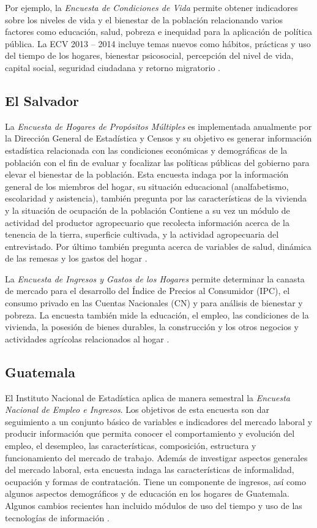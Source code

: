 \documentclass[
  12pt,
]{book}
\begin{document}
Por ejemplo, la \emph{Encuesta de Condiciones de Vida} permite obtener indicadores sobre los niveles de vida y el bienestar de la población relacionando varios factores como educación, salud, pobreza e inequidad para la aplicación de política pública. La ECV 2013 -- 2014 incluye temas nuevos como hábitos, prácticas y uso del tiempo de los hogares, bienestar psicosocial, percepción del nivel de vida, capital social, seguridad ciudadana y retorno migratorio \citep{INEC2-EC}.

\hypertarget{el-salvador}{%
\subsection{El Salvador}\label{el-salvador}}

La \emph{Encuesta de Hogares de Propósitos Múltiples} es implementada anualmente por la Dirección General de Estadística y Censos y su objetivo es generar información estadística relacionada con las condiciones económicas y demográficas de la población con el fin de evaluar y focalizar las políticas públicas del gobierno para elevar el bienestar de la población. Esta encuesta indaga por la información general de los miembros del hogar, su situación educacional (analfabetismo, escolaridad y asistencia), también pregunta por las características de la vivienda y la situación de ocupación de la población Contiene a su vez un módulo de actividad del productor agropecuario que recolecta información acerca de la tenencia de la tierra, superficie cultivada, y la actividad agropecuaria del entrevistado. Por último también pregunta acerca de variables de salud, dinámica de las remesas y los gastos del hogar \citep{DIGESTYC-SV}.

La \emph{Encuesta de Ingresos y Gastos de los Hogares} permite determinar la canasta de mercado para el desarrollo del Índice de Precios al Consumidor (IPC), el consumo privado en las Cuentas Nacionales (CN) y para análisis de bienestar y pobreza. La encuesta también mide la educación, el empleo, las condiciones de la vivienda, la posesión de bienes durables, la construcción y los otros negocios y actividades agrícolas relacionados al hogar \citep{DIGESTYC2-SV}.

\hypertarget{guatemala}{%
\subsection{Guatemala}\label{guatemala}}

El Instituto Nacional de Estadística aplica de manera semestral la \emph{Encuesta Nacional de Empleo e Ingresos}. Los objetivos de esta encuesta son dar seguimiento a un conjunto básico de variables e indicadores del mercado laboral y producir información que permita conocer el comportamiento y evolución del empleo, el desempleo, las características, composición, estructura y funcionamiento del mercado de trabajo. Además de investigar aspectos generales del mercado laboral, esta encuesta indaga las características de informalidad, ocupación y formas de contratación. Tiene un componente de ingresos, así como algunos aspectos demográficos y de educación en los hogares de Guatemala. Algunos cambios recientes han incluido módulos de uso del tiempo y uso de las tecnologías de información \citep{INE-GT}.
\end{document}
